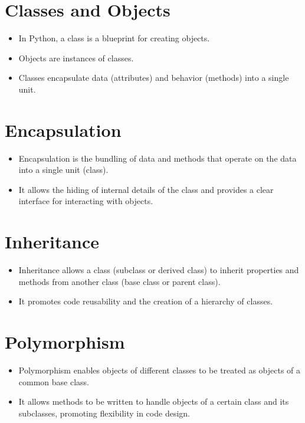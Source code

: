 \documentclass{article}
\begin{document}
\section{Classes and Objects}
\begin{itemize}
    \item In Python, a class is a blueprint for creating objects.
    \item Objects are instances of classes.
    \item Classes encapsulate data (attributes) and behavior (methods) into a single unit.
\end{itemize}

\section{Encapsulation}
\begin{itemize}
    \item Encapsulation is the bundling of data and methods that operate on the data into a single unit (class).
    \item It allows the hiding of internal details of the class and provides a clear interface for interacting with objects.
\end{itemize}

\section{Inheritance}
\begin{itemize}
    \item Inheritance allows a class (subclass or derived class) to inherit properties and methods from another class (base class or parent class).
    \item It promotes code reusability and the creation of a hierarchy of classes.
\end{itemize}

\section{Polymorphism}
\begin{itemize}
    \item Polymorphism enables objects of different classes to be treated as objects of a common base class.
    \item It allows methods to be written to handle objects of a certain class and its subclasses, promoting flexibility in code design.
\end{itemize}
\end{document}
